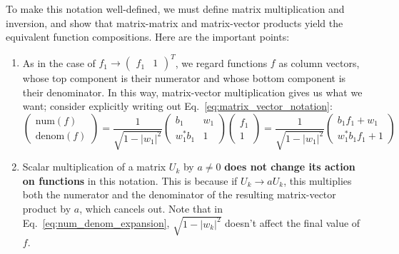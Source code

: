 \begin{appendices}
To make this notation well-defined, we must define matrix multiplication and inversion, and show that matrix-matrix and matrix-vector products yield the equivalent function compositions. Here are the important points:
\begin{enumerate}
    \item As in the case of $f_1 \rightarrow\begin{pmatrix} f_1 & 1 \end{pmatrix}^T$, we regard functions $f$ as column vectors, whose top component is their numerator and whose bottom component is their denominator. In this way, matrix-vector multiplication gives us what we want; consider explicitly writing out Eq.~\eqref{eq:matrix_vector_notation}:
    \begin{equation}
        \begin{pmatrix}
            \mathrm{num}(f) \\ \mathrm{denom}(f)
        \end{pmatrix} = \frac{1}{\sqrt{1 - |w_1|^2}}\begin{pmatrix}
            b_1 & w_1 \\ w_1^* b_1 & 1
        \end{pmatrix} \begin{pmatrix} f_1 \\ 1 \end{pmatrix} = \frac{1}{\sqrt{1 - |w_1|^2}}\begin{pmatrix}
            b_1 f_1 + w_1 \\ w_1^* b_1 f_1 + 1
        \end{pmatrix}
        \label{eq:num_denom_expansion}
    \end{equation} 

    \item Scalar multiplication of a matrix $U_k$ by $a\neq 0$ \textbf{does not change its action on functions} in this notation. This is because if $U_k\rightarrow a U_k$, this multiplies both the numerator and the denominator of the resulting matrix-vector product by $a$, which cancels out. Note that in Eq.~\eqref{eq:num_denom_expansion}, $\sqrt{1 - |w_k|^2}$ doesn't affect the final value of $f$. 


\end{enumerate}
\end{appendices}
